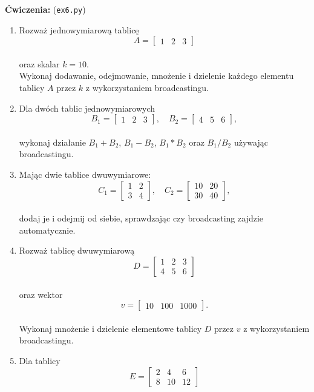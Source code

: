 \documentclass[
  letterpaper,
  DIV=11,
  numbers=noendperiod]{scrreprt}
\begin{document}
\textbf{Ćwiczenia:} (\texttt{ex6.py})

\begin{enumerate}
\def\labelenumi{\arabic{enumi}.}
\item
  Rozważ jednowymiarową tablicę\\
  \[A = \begin{bmatrix}1 & 2 & 3\end{bmatrix}\]\\
  oraz skalar \(k = 10\).\\
  Wykonaj dodawanie, odejmowanie, mnożenie i dzielenie każdego elementu
  tablicy \(A\) przez \(k\) z wykorzystaniem broadcastingu.
\item
  Dla dwóch tablic jednowymiarowych\\
  \[B_1 = \begin{bmatrix}1 & 2 & 3\end{bmatrix}, \quad B_2 = \begin{bmatrix}4 & 5 & 6\end{bmatrix},\]\\
  wykonaj działanie \(B_1 + B_2\), \(B_1 - B_2\), \(B_1 * B_2\) oraz
  \(B_1 / B_2\) używając broadcastingu.
\item
  Mając dwie tablice dwuwymiarowe:\\
  \[C_1 = \begin{bmatrix}1 & 2 \\ 3 & 4\end{bmatrix}, \quad C_2 = \begin{bmatrix}10 & 20 \\ 30 & 40\end{bmatrix},\]\\
  dodaj je i odejmij od siebie, sprawdzając czy broadcasting zajdzie
  automatycznie.
\item
  Rozważ tablicę dwuwymiarową\\
  \[D = \begin{bmatrix}1 & 2 & 3 \\ 4 & 5 & 6\end{bmatrix}\]\\
  oraz wektor\\
  \[v = \begin{bmatrix}10 & 100 & 1000\end{bmatrix}.\]\\
  Wykonaj mnożenie i dzielenie elementowe tablicy \(D\) przez \(v\) z
  wykorzystaniem broadcastingu.
\item
  Dla tablicy\\
  \[E = \begin{bmatrix}2 & 4 & 6 \\ 8 & 10 & 12\end{bmatrix}\]\\

\end{enumerate}
\end{document}
